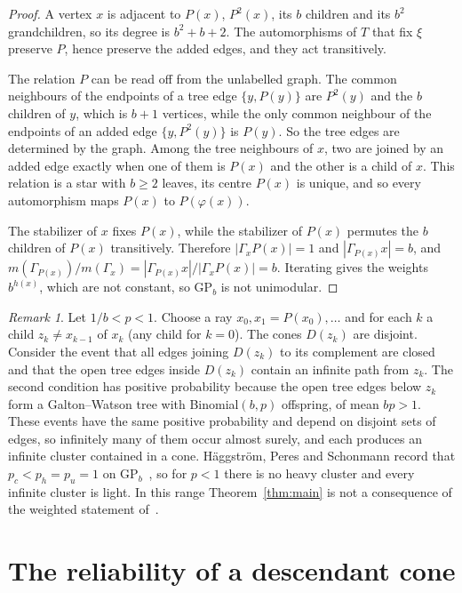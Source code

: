 \documentclass[11pt]{amsart}
\theoremstyle{remark}
\newtheorem{remark}[theorem]{Remark}
\newcommand{\GP}{\mathrm{GP}_b}
\begin{document}
\begin{proof}
A vertex $x$ is adjacent to $P(x)$, $P^2(x)$, its $b$ children and its $b^2$ grandchildren, so its degree is $b^2+b+2$.
The automorphisms of $T$ that fix $\xi$ preserve $P$, hence preserve the added edges, and they act transitively.

The relation $P$ can be read off from the unlabelled graph. The common neighbours of the endpoints of a tree edge
$\{y,P(y)\}$ are $P^2(y)$ and the $b$ children of $y$, which is $b+1$ vertices, while the only common neighbour of the
endpoints of an added edge $\{y,P^2(y)\}$ is $P(y)$. So the tree edges are determined by the graph. Among the tree
neighbours of $x$, two are joined by an added edge exactly when one of them is $P(x)$ and the other is a child of $x$.
This relation is a star with $b\ge2$ leaves, its centre $P(x)$ is unique, and so every automorphism maps $P(x)$ to
$P(\varphi(x))$.

The stabilizer of $x$ fixes $P(x)$, while the stabilizer of $P(x)$ permutes the $b$ children of $P(x)$ transitively.
Therefore $|\Gamma_x P(x)|=1$ and $|\Gamma_{P(x)}x|=b$, and $m(\Gamma_{P(x)})/m(\Gamma_x)=|\Gamma_{P(x)}x|/|\Gamma_x
P(x)|=b$. Iterating gives the weights $b^{h(x)}$, which are not constant, so $\GP$ is not unimodular.
\end{proof}

\begin{remark}\label{rem:light}
Let $1/b<p<1$. Choose a ray $x_0,x_1=P(x_0),\dots$ and for each $k$ a child $z_k\neq x_{k-1}$ of $x_k$ (any child for
$k=0$). The cones $D(z_k)$ are disjoint. Consider the event that all edges joining $D(z_k)$ to its complement are closed
and that the open tree edges inside $D(z_k)$ contain an infinite path from $z_k$. The second condition has positive
probability because the open tree edges below $z_k$ form a Galton--Watson tree with Binomial$(b,p)$ offspring, of mean
$bp>1$. These events have the same positive probability and depend on disjoint sets of edges, so infinitely many of them
occur almost surely, and each produces an infinite cluster contained in a cone. Häggström, Peres and Schonmann record
that $p_c<p_h=p_u=1$ on $\GP$~\cite{HPS99}, so for $p<1$ there is no heavy cluster and every infinite cluster is light.
In this range Theorem~\ref{thm:main} is not a consequence of the weighted statement of~\cite{BCRTT}.
\end{remark}

\section{The reliability of a descendant cone}\label{sec:cone}
\end{document}
